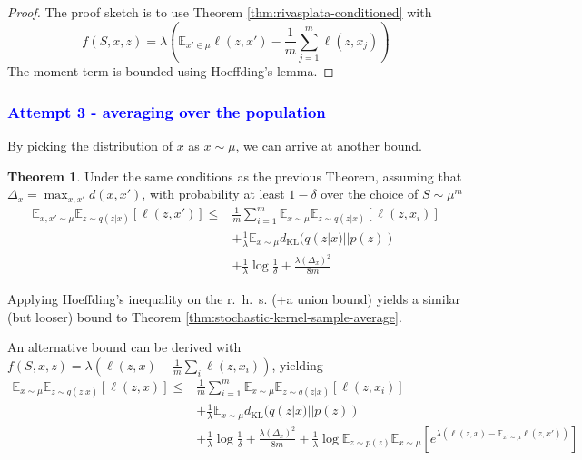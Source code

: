 \documentclass[letterpaper]{article}
\theoremstyle{definition}
\newtheorem{theorem}{Theorem}
\newcommand{\LF}[1]{{\textcolor{blue}{#1}}}
\begin{document}
\begin{proof}
    The proof sketch is to use Theorem \ref{thm:rivasplata-conditioned} with $$f(S,x,z)=\lambda\left (\mathbb{E}_{x'\in \mu}\ell(z,x')-\frac{1}{m}\sum_{j=1}^{m}\ell(z,x_j)\right )$$
    The moment term is bounded using Hoeffding's lemma.
\end{proof}

\LF{\subsubsection{Attempt 3 - averaging over the population}}

By picking the distribution of $x$ as $x\sim \mu$, we can arrive at another bound.

\begin{theorem}
    Under the same conditions as the previous Theorem, assuming that $\Delta_x=\max_{x,x'}d(x,x')$, with probability at least $1-\delta$ over the choice of $S\sim \mu^m$
    \begin{equation}
\begin{split}
    \mathbb{E}_{x,x'\sim \mu}\mathbb{E}_{z\sim q(z|x)}\left [\ell(z,x') \right ]\leq &\frac{1}{m}\sum_{i=1}^{m}\mathbb{E}_{x\sim \mu}\mathbb{E}_{z\sim q(z|x)}\left [\ell(z,x_{i}) \right ]\\
    &+ \frac{1}{\lambda}\mathbb{E}_{x\sim \mu}d_{\mathrm{KL}}(q(z|x)||p(z)) \\
     &+\frac{1}{\lambda}\log\frac{1}{\delta} 
    + \frac{\lambda (\Delta_x)^2}{8m}
\end{split}
\end{equation}
\end{theorem}

Applying Hoeffding's inequality on the r.\ h.\ s. (+a union bound) yields a similar (but looser) bound to Theorem \ref{thm:stochastic-kernel-sample-average}.

An alternative bound can be derived with $f(S,x,z)=\lambda\left (\ell(z,x)-\frac{1}{m}\sum_i \ell(z,x_i)\right )$, yielding
\begin{equation*}
\begin{split}
    \mathbb{E}_{x\sim \mu}\mathbb{E}_{z\sim q(z|x)}\left [\ell(z,x) \right ]\leq &\frac{1}{m}\sum_{i=1}^{m}\mathbb{E}_{x\sim \mu}\mathbb{E}_{z\sim q(z|x)}\left [\ell(z,x_{i}) \right ]\\
    &+ \frac{1}{\lambda}\mathbb{E}_{x\sim \mu}d_{\mathrm{KL}}(q(z|x)||p(z)) \\
     &+\frac{1}{\lambda}\log\frac{1}{\delta} 
    + \frac{\lambda (\Delta_x)^2}{8m} + \frac{1}{\lambda}\log \mathbb{E}_{z\sim p(z)}\mathbb{E}_{x\sim \mu}\left [e^{\lambda(\ell(z,x)-\mathbb{E}_{x'\sim \mu}\ell(z,x'))}\right ]
\end{split}
\end{equation*}
\end{document}
